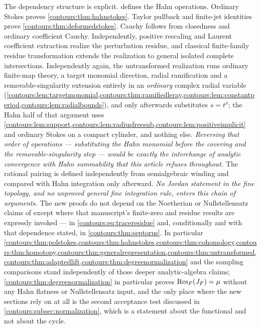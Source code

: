 \documentclass[11pt,letterpaper]{article}
\theoremstyle{definition}
\theoremstyle{remark}
\numberwithin{equation}{section}
\begin{document}
The dependency structure is explicit.  defines the Hahn
operations. Ordinary Stokes proves \cref{contours:thm:hahnstokes}. Taylor pullback
and finite-jet identities prove \cref{contours:thm:deformedstokes}. Cauchy follows
from closedness and ordinary coefficient Cauchy. Independently, positive rescaling
and Laurent coefficient extraction realize the perturbation residue, and classical
finite-family residue transformation extends the realization to general isolated
complete intersections. Independently again, the untransformed realization runs
ordinary finite-map theory, a target monomial direction, radial ramification and
a removable-singularity extension entirely in an \emph{ordinary} complex radial
variable (\cref{contours:lem:targetmonomial,contours:thm:ramifiedleray,contours:lem:constantperiod,contours:lem:radialbounds}),
and only afterwards substitutes $s=t^\rho$; the Hahn half of that argument uses
\cref{contours:lem:support,contours:lem:radiusfreesub,contours:lem:positiveimplicit}
and ordinary Stokes on a compact cylinder, and nothing else. \emph{Reversing that
order of operations --- substituting the Hahn monomial before the covering and
the removable-singularity step --- would be exactly the interchange of analytic
convergence with Hahn summability that this article refuses throughout.} The
rational pairing is defined independently from
semialgebraic winding and compared with Hahn integration only afterward. \emph{No
Jordan statement in the fine topology, and no unproved general fine integration rule,
enters this chain of arguments.} The new proofs do not depend on the Noetherian or
Nullstellensatz claims of \cite{Geometry} except where that manuscript's finite-zero
and residue results are expressly invoked --- in
\eqref{contours:eq:traceresidue} and, conditionally and with that dependence stated,
in \cref{contours:thm:septorus}. In particular \cref{contours:thm:polstokes,contours:thm:hahnstokes,contours:thm:cohomology,contours:thm:homotopy,contours:thm:generalrepresentation,contours:thm:untransformed,contours:thm:adaptedlift,contours:thm:degreenormalization} and the sampling comparisons stand independently
of those deeper analytic-algebra claims; \cref{contours:thm:degreenormalization}
in particular proves $\operatorname{Res}_F(J_F)=\mu$ without any Hahn flatness or
Nullstellensatz input, and the only place where the new sections rely on
\cite{Geometry} at all is the second acceptance test discussed in
\cref{contours:subsec:normalization}, which is a statement about the functional
and not about the cycle.
\end{document}
